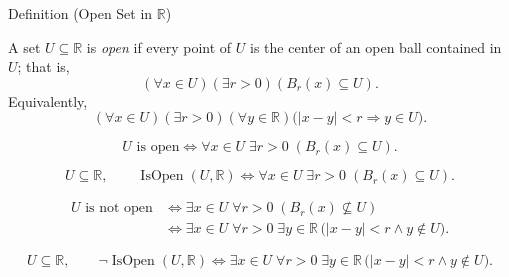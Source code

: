 \begin{definitionbox}{Definition (Open Set in $\mathbb{R}$)}
\begin{definition}
\label{def:open-set}
A set $U\subseteq\mathbb{R}$ is \emph{open} if every point of $U$ is the
center of an open ball contained in $U$; that is,
\[
  (\forall x\in U)(\exists r>0)(B_r(x)\subseteq U).
\]
Equivalently,
\[
  (\forall x\in U)(\exists r>0)(\forall y\in\mathbb{R})
  \bigl(|x-y|<r\Longrightarrow y\in U\bigr).
\]
\end{definition}
\end{definitionbox}
\begin{remark*}
\[
U \text{ is open} \Longleftrightarrow \forall x\in U\;\exists r>0\;(B_{r}(x)\subseteq U).
\]
\end{remark*}

\begin{remark*}
\[
U\subseteq\mathbb{R},\qquad
\operatorname{IsOpen}(U,\mathbb{R})
\Longleftrightarrow
\forall x\in U\;\exists r>0\;(B_{r}(x)\subseteq U).
\]
\end{remark*}
\begin{remark*}
\[
\begin{aligned}
U \text{ is not open}
&\Longleftrightarrow
\exists x\in U\;\forall r>0\;(B_{r}(x)\not\subseteq U)\\
&\Longleftrightarrow
\exists x\in U\;\forall r>0\;\exists y\in\mathbb{R}\,
\bigl(|x-y|<r\land y\notin U\bigr).
\end{aligned}
\]
\end{remark*}
\begin{remark*}
\[
U\subseteq\mathbb{R},\qquad
\neg\operatorname{IsOpen}(U,\mathbb{R})
\Longleftrightarrow
\exists x\in U\;\forall r>0\;\exists y\in\mathbb{R}\,
\bigl(|x-y|<r\land y\notin U\bigr).
\]
\end{remark*}


